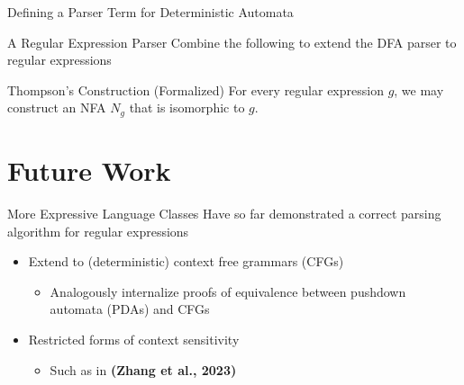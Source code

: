 \documentclass[10pt]{beamer}
\makeatletter
\newif\ifdraft
\newcommand{\todoin}[1]{\ifdraft{\todo[inline]{TODO:\@ #1}}\fi}
\makeatother
\begin{document}
\begin{frame}{Defining a Parser Term for Deterministic Automata}



  \todoin{Graphics defining a parser for DFAs}
\end{frame}

\begin{frame}{A Regular Expression Parser}
  Combine the following to extend the DFA parser to regular expressions

  \begin{block}{Thompson's Construction (Formalized)}
    For every regular expression $g$, we may construct an NFA $N_{g}$ that is isomorphic to $g$.
  \end{block}

\end{frame}

\section{Future Work}

\begin{frame}{More Expressive Language Classes}
  Have so far demonstrated a correct parsing algorithm for regular expressions

  \begin{itemize}
    \item<1-> Extend to (deterministic) context free grammars (CFGs)
        \begin{itemize}
          \item<2-> Analogously internalize proofs of equivalence between pushdown automata (PDAs) and CFGs
        \end{itemize}
    \item<3-> Restricted forms of context sensitivity
        \begin{itemize}
          \item<4-> Such as in \textbf{(Zhang et al., 2023)}
        \end{itemize}
  \end{itemize}
\end{frame}
\end{document}
